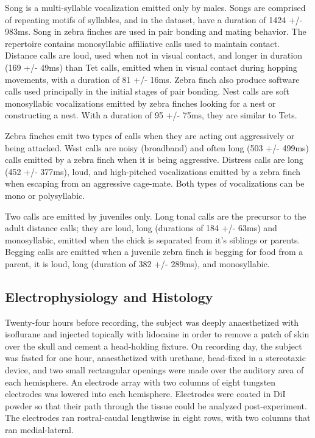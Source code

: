 Song is a multi-syllable vocalization emitted only by males. Songs are comprised of repeating motifs of syllables, and in the dataset, have a duration of 1424 +/- 983ms. Song in zebra finches are used in pair bonding and mating behavior. The repertoire contains monosyllabic affiliative calls used to maintain contact. Distance calls are loud, used when not in visual contact, and longer in duration (169 +/- 49ms) than Tet calls, emitted when in visual contact during hopping movements, with a duration of 81 +/- 16ms. Zebra finch also produce software calls used principally in the initial stages of pair bonding. Nest calls are soft monosyllabic vocalizations emitted by zebra finches looking for a nest or constructing a nest. With a duration of 95 +/- 75ms, they are similar to Tets.

Zebra finches emit two types of calls when they are acting out aggressively or being attacked. Wsst calls are noisy (broadband) and often long (503 +/- 499ms) calls emitted by a zebra finch when it is being aggressive. Distress calls are long (452 +/- 377ms), loud, and high-pitched vocalizations emitted by a zebra finch when escaping from an aggressive cage-mate. Both types of vocalizations can be mono or polysyllabic.

Two calls are emitted by juveniles only. Long tonal calls are the precursor to the adult distance calls; they are loud, long (durations of 184 +/- 63ms) and monosyllabic, emitted when the chick is separated from it’s siblings or parents. Begging calls are emitted when a juvenile zebra finch is begging for food from a parent, it is loud, long (duration of 382 +/- 289ms), and monosyllabic.

\subsection{Electrophysiology and Histology}

    Twenty-four hours before recording, the subject was deeply anaesthetized with isoflurane and injected topically with lidocaine in order to remove a patch of skin over the skull and cement a  head-holding fixture. On recording day, the subject was fasted for one hour, anaesthetized with urethane, head-fixed in a stereotaxic device, and two small rectangular openings were made over the auditory area of each hemisphere. An electrode array with two columns of eight tungsten electrodes was lowered into each hemisphere. Electrodes were coated in DiI powder so that their path through the tissue could be analyzed post-experiment. The electrodes ran rostral-caudal lengthwise in eight rows, with two columns that ran medial-lateral.

